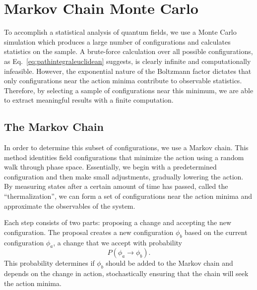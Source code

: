 \section{Markov Chain Monte Carlo}

To accomplish a statistical analysis of quantum fields, we use a Monte Carlo simulation which produces a large number of configurations and calculates statistics on the sample. A brute-force calculation over all possible configurations, as Eq.~\ref{eq:pathintegraleuclidean} suggests, is clearly infinite and computationally infeasible. However, the exponential nature of the Boltzmann factor dictates that only configurations near the action minima contribute to observable statistics. Therefore, by selecting a sample of configurations near this minimum, we are able to extract meaningful results with a finite computation. 

\subsection{The Markov Chain}
In order to determine this subset of configurations, we use a Markov chain. This method identities field configurations that minimize the action using a random walk through phase space. Essentially, we begin with a predetermined configuration and then make small adjustments, gradually lowering the action. By measuring states after a certain amount of time has passed, called the ``thermalization'', we can form a set of configurations near the action minima and approximate the observables of the system. 

Each step consists of two parts: proposing a change and accepting the new configuration. The proposal creates a new configuration $\phi_b$ based on the current configuration $\phi_a$, a change that we accept with probability
\begin{equation}
P(\phi_a \rightarrow \phi_b).
\end{equation}
This probability determines if $\phi_b$ should be added to the Markov chain and depends on the change in action, stochastically ensuring that the chain will seek the action minima. 

